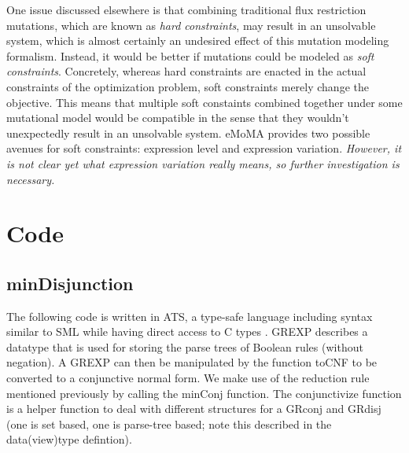 \documentclass[phd,tocprelim]{cornell}
\theoremstyle{break}
\begin{document}
One issue discussed elsewhere is that combining traditional flux restriction mutations, which are known as 
\emph{hard constraints}, may result in an unsolvable system, which is almost certainly an undesired effect
of this mutation modeling formalism. Instead, it would be better if mutations could be modeled as 
\emph{soft constraints}. Concretely, whereas hard constraints are enacted in the actual constraints of the 
optimization problem, soft constraints merely change the objective. This means that multiple soft constaints
combined together under some mutational model would be compatible in the sense that they wouldn't unexpectedly
result in an unsolvable system. eMoMA provides two possible avenues for soft constraints: expression level 
and expression variation. \emph{However, it is not clear yet what expression variation really means, so further
investigation is necessary.}

\section{Code}
\subsection{minDisjunction}

The following code is written in ATS, a type-safe language including syntax similar to SML while
having direct access to C types \cite{ATStypes03}.
GREXP describes a datatype that is used for storing the parse trees of Boolean rules (without negation).
A GREXP can then be manipulated by the function toCNF to be converted to a conjunctive normal form.
We make use of the reduction rule mentioned previously by calling the minConj function. The 
conjunctivize function is a helper function to deal with different structures for a GRconj
and GRdisj (one is set based, one is parse-tree based; note this described in the data(view)type defintion).
\end{document}
